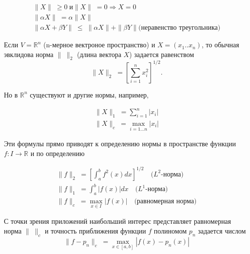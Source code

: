 \begin{equation}
\begin{array}{l}
\parallel X \parallel \; \geq 0 \; \text{и}  \parallel X \parallel \; = 0 \Rightarrow X = 0 \\
\parallel \alpha X \parallel \; = \alpha \parallel X \parallel  \\ 
\parallel \alpha X + \beta Y\parallel \; \leq \; \parallel \alpha  X \parallel + \parallel \beta Y \parallel \text{(неравенство треугольника)}
\end{array}
\end{equation}

Если $V = \mathbb{R}^n$ (n-мерное вектроное пространство) и $X = (x_1 .. x_n)$, то обычная эвклидова норма $\parallel\;\parallel_2$ (длина вектора $X$) задается равенством
\begin{equation}
\parallel X\parallel_2 \; = \left[\sum_{i=1}^{n} x_i^2 \right]^{1/2}.
\end{equation}

Но в $\mathbb{R}^n$ существуют и другие нормы, например,

\begin{equation}
\begin{gathered}
\parallel X \parallel_1 \; = \sum_{i = 1}^{n}|x_i| \\
\parallel X \parallel_c \; = \max_{i = 1...n}|x_i|
\end{gathered}
\end{equation}

Эти формулы прямо приводят к определению нормы в пространстве функции $f: I \rightarrow \mathbb{R}$ и по определению

\begin{equation}
\begin{gathered}
\parallel f \parallel_2 \; = \left[ \int_{a}^{b} f^2(x)dx \right]^{1/2} \quad \text{($L^2$-норма)}\\
\parallel f \parallel_1 \; = \int_{a}^{b} |f(x)|dx \quad \text{($L^1$-норма)} \\
\parallel f \parallel_c \; = \max_{x \in I}|f(x)| \quad \text{(равномерная норма)}
\end{gathered}
\end{equation} 

С точки зрения приложений наибольший интерес представляет равномерная норма $\parallel \; \parallel_c	$ и точность приближения функции $f$ полиномом $p_n$ задается числом 
\begin{equation}
\parallel f - p_n \parallel_c \; = \max_{x\in [a, b]} |f(x)-p_n(x)|
\end{equation}


